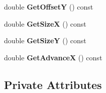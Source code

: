 \begin{DoxyCompactItemize}
double {\bfseries Get\+OffsetY} () const
\item 
\mbox{\label{class_flounder_1_1_character_aacaaa9bb18544eb39db45bbb1783276d}} 
double {\bfseries Get\+SizeX} () const
\item 
\mbox{\label{class_flounder_1_1_character_a04490f8bc47d3bf893ebed4c5b4e05d1}} 
double {\bfseries Get\+SizeY} () const
\item 
\mbox{\label{class_flounder_1_1_character_aef65c0c2875c9117b9909959743a8853}} 
double {\bfseries Get\+AdvanceX} () const
\end{DoxyCompactItemize}
\subsection*{Private Attributes}
